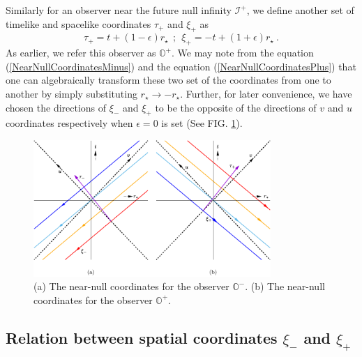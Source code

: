 \documentclass[aps,12pt,showpacs]{revtex4-2}
\def\rstar{r_{\star}}
\def\scriplus{\mathscr{I}^{+}}
\def\observerminus{\mathbb{O}^{-}}
\def\observerplus{\mathbb{O}^{+}}
\begin{document}
Similarly for an observer near the future null infinity $\scriplus$, we define 
another set of timelike and spacelike coordinates $\tau_{+}$ and $\xi_{+}$ 
as
%
\begin{equation}\label{NearNullCoordinatesPlus}
\tau_{+} = t + (1-\epsilon)\rstar ~~;~~ \xi_{+} = -t + (1+\epsilon)\rstar  ~.
\end{equation}
%
As earlier, we refer this observer as $\observerplus$. We may note from the 
equation (\ref{NearNullCoordinatesMinus}) and the equation 
(\ref{NearNullCoordinatesPlus}) that one can algebraically transform these two 
set of the coordinates from one to another by simply substituting 
$\rstar \to -\rstar$. Further, for later convenience, we have chosen the 
directions of $\xi_{-}$ and $\xi_{+}$ to be the opposite of the directions of 
$v$ and $u$ coordinates respectively when $\epsilon=0$ is set (See FIG. 
\ref{fig:NearNull}).



\begin{figure}
\includegraphics[width=9cm]{near-null.pdf}
\caption{(a) The near-null coordinates for the observer $\observerminus$.
(b) The near-null coordinates for the observer $\observerplus$.}
\label{fig:NearNull} 
\end{figure}




\subsection{Relation between spatial coordinates $\xi_{-}$ and $\xi_{+}$}
\end{document}
